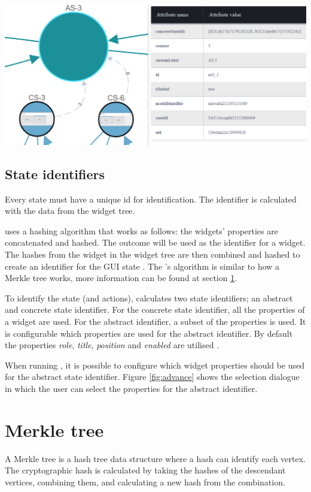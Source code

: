 \bigskip
\begingroup
\captionsetup{type=figure}
\includegraphics[scale=0.5]{images/abstract-model.png}
\label{fig:abstract-model}
\endgroup

\subsection{State identifiers} \label{state-identifiers}
Every state must have a unique id for identification. The identifier is calculated with the data from the widget tree. 

\testar uses a hashing algorithm that works as follows: the widgets' properties are concatenated and hashed. The outcome will be used as the identifier for a widget. The hashes from the widget in the widget tree are then combined and hashed to create an identifier for the GUI state \cite{VosAho2021}. The \testar's algorithm is similar to how a Merkle tree works, more information can be found at section \ref{merkle-tree}.

To identify the state (and actions), \testar calculates two state identifiers; an abstract and concrete state identifier. For the concrete state identifier, all the properties of a widget are used. For the abstract identifier, a subset of the properties is used. It is configurable which properties are used for the abstract identifier. By default the properties \textit{role}, \textit{title}, \textit{position} and \textit{enabled} are utilised \cite{VosAho2021, thesisMulders}.

When running \testar, it is possible to configure which widget properties should be used for the abstract state identifier. Figure \ref{fig:advance} shows the selection dialogue in which the user can select the properties for the abstract identifier.

\section{Merkle tree} \label{merkle-tree}
A Merkle tree is a hash tree data structure where a hash can identify each vertex. \cite{merkle-tree} The cryptographic hash is calculated by taking the hashes of the descendant vertices, combining them, and calculating a new hash from the combination. 

